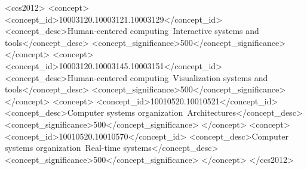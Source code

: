 \documentclass[sigchi]{acmart} %
\begin{document}
%
%
\begin{CCSXML}
<ccs2012>
<concept>
<concept_id>10003120.10003121.10003129</concept_id>
<concept_desc>Human-centered computing~Interactive systems and tools</concept_desc>
<concept_significance>500</concept_significance>
</concept>
<concept>
<concept_id>10003120.10003145.10003151</concept_id>
<concept_desc>Human-centered computing~Visualization systems and tools</concept_desc>
<concept_significance>500</concept_significance>
</concept>
<concept>
<concept_id>10010520.10010521</concept_id>
<concept_desc>Computer systems organization~Architectures</concept_desc>
<concept_significance>500</concept_significance>
</concept>
<concept>
<concept_id>10010520.10010570</concept_id>
<concept_desc>Computer systems organization~Real-time systems</concept_desc>
<concept_significance>500</concept_significance>
</concept>
</ccs2012>
\end{CCSXML}


%

%

\end{document}
